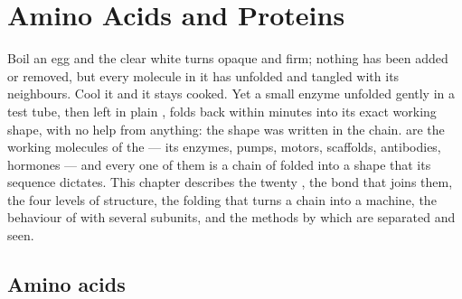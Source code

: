 \chapter{Amino Acids and Proteins}\label{ch:b1:proteins}

Boil an egg and the clear white turns opaque and firm; nothing has been
added or removed, but every  molecule in it has unfolded and
tangled with its neighbours. Cool it and it stays cooked. Yet a small
enzyme unfolded gently in a test tube, then left in plain , folds
back within minutes into its exact working shape, with no help from
anything: the shape was written in the chain.  are the working
molecules of the  --- its enzymes, pumps, motors, scaffolds,
antibodies, hormones --- and every one of them is a chain of  folded into a shape that its sequence dictates. This chapter
describes the twenty , the bond that joins them, the four
levels of  structure, the folding that turns a chain into a
machine, the  behaviour of  with several subunits,
and the methods by which  are separated and seen.

\section{Amino acids}

